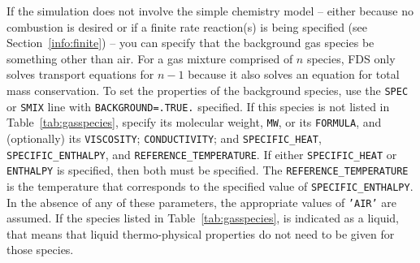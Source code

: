 \documentclass[11pt]{book}
\newcommand{\ct}{\tt\small}
\begin{document}
If the simulation does not involve the simple chemistry model -- either because no combustion is
desired or if a finite rate reaction(s) is being specified (see Section~\ref{info:finite}) -- you can
specify that the background gas species be something other than air. For a gas mixture comprised of
$n$ species, FDS only solves transport equations for $n-1$ because it also solves an equation for
total mass conservation. To set the properties of the background species, use the
{\ct SPEC} or {\ct SMIX} line with {\ct BACKGROUND=.TRUE.} specified.
If this species is not listed in Table~\ref{tab:gasspecies}, specify its molecular weight, {\ct MW}, or its {\ct FORMULA},
and (optionally) its {\ct VISCOSITY}; {\ct CONDUCTIVITY}; and {\ct SPECIFIC\_HEAT},
{\ct SPECIFIC\_ENTHALPY}, and {\ct REFERENCE\_TEMPERATURE}.
If either {\ct SPECIFIC\_HEAT} or {\ct ENTHALPY} is specified, then both must be specified.
The {\ct REFERENCE\_TEMPERATURE} is the temperature that corresponds to the specified value
of {\ct SPECIFIC\_ENTHALPY}.  In the absence of any of these parameters, the appropriate
values of {\ct 'AIR'} are assumed.  If the species listed in Table~\ref{tab:gasspecies}, is indicated as a liquid, that means that liquid thermo-physical
properties do not need to be given for those species.
\end{document}

